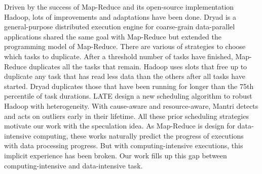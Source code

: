 Driven by the success of Map-Reduce \cite{dean_mapreduce:_2004} and its open-source implementation Hadoop, lots of improvements \cite{zaharia_improving_2008} \cite{ananthanarayanan_reining_2010} and adaptations \cite{mackey_introducing_2008} have been done. Dryad \cite{isard_dryad:_2007} is a general-purpose distributed execution engine for coarse-grain data-parallel applications shared the same goal with Map-Reduce but extended the programming model of Map-Reduce. There are various of strategies to choose which tasks to duplicate. After a threshold number of tasks havefinished, Map-Reduce duplicates all the tasks that remain. Hadoop uses slots that free up to duplicate any task that has read less data than the others after all tasks have started. Dryad duplicates those that have been running for longer than the 75th percentile of task durations. LATE \cite{zaharia_improving_2008} design a new scheduling algorithm to robust Hadoop with heterogeneity. With cause-aware and resource-aware, Mantri\cite{ananthanarayanan_reining_2010} detects and acts on outliers early in their lifetime. All these prior scheduling strategies motivate our work with the speculation idea. As Map-Reduce is design for data-intensive computing, these works naturally predict the progress of executions with data processing progress. But with computing-intensive executions, this implicit experience has been broken. Our work fills up this gap between computing-intensive and data-intensive task.


